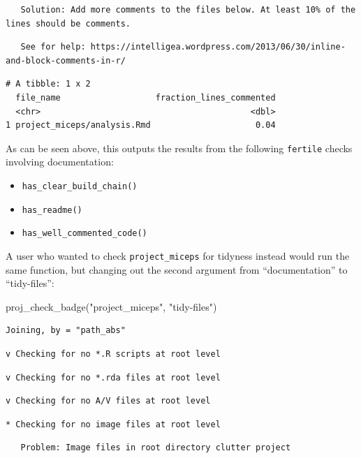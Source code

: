 \documentclass[12pt,twoside]{reedthesis}
\newenvironment{Shaded}{\begin{snugshade}}{\end{snugshade}}
\newcommand{\FunctionTok}[1]{\textcolor[rgb]{0.00,0.00,0.00}{#1}}
\newcommand{\NormalTok}[1]{#1}
\newcommand{\StringTok}[1]{\textcolor[rgb]{0.31,0.60,0.02}{#1}}
\providecommand{\tightlist}{%
  \setlength{\itemsep}{0pt}\setlength{\parskip}{0pt}}
\begin{document}
\begin{verbatim}
   Solution: Add more comments to the files below. At least 10% of the lines should be comments.
\end{verbatim}
\begin{verbatim}
   See for help: https://intelligea.wordpress.com/2013/06/30/inline-and-block-comments-in-r/
\end{verbatim}
\begin{verbatim}
# A tibble: 1 x 2
  file_name                   fraction_lines_commented
  <chr>                                          <dbl>
1 project_miceps/analysis.Rmd                     0.04
\end{verbatim}
As can be seen above, this outputs the results from the following \texttt{fertile} checks involving documentation:
\begin{itemize}
\tightlist
\item
  \texttt{has\_clear\_build\_chain()}
\item
  \texttt{has\_readme()}
\item
  \texttt{has\_well\_commented\_code()}
\end{itemize}
A user who wanted to check \texttt{project\_miceps} for tidyness instead would run the same function, but changing out the second argument from ``documentation'' to ``tidy-files'':
\begin{Shaded}
\begin{Highlighting}[]
\FunctionTok{proj\_check\_badge}\NormalTok{(}\StringTok{"project\_miceps"}\NormalTok{, }\StringTok{"tidy{-}files"}\NormalTok{)}
\end{Highlighting}
\end{Shaded}
\begin{verbatim}
Joining, by = "path_abs"
\end{verbatim}
\begin{verbatim}
v Checking for no *.R scripts at root level
\end{verbatim}
\begin{verbatim}
v Checking for no *.rda files at root level
\end{verbatim}
\begin{verbatim}
v Checking for no A/V files at root level
\end{verbatim}
\begin{verbatim}
* Checking for no image files at root level
\end{verbatim}
\begin{verbatim}
   Problem: Image files in root directory clutter project
\end{verbatim}
\end{document}
